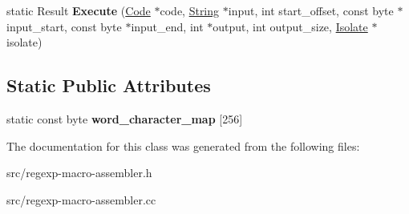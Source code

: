 \begin{DoxyCompactItemize}
\item 
\hypertarget{classv8_1_1internal_1_1_native_reg_exp_macro_assembler_acb1847e00b0dadbc2a75cba6baf1f192}{}static Result {\bfseries Execute} (\hyperlink{classv8_1_1internal_1_1_code}{Code} $\ast$code, \hyperlink{classv8_1_1internal_1_1_string}{String} $\ast$input, int start\+\_\+offset, const byte $\ast$input\+\_\+start, const byte $\ast$input\+\_\+end, int $\ast$output, int output\+\_\+size, \hyperlink{classv8_1_1internal_1_1_isolate}{Isolate} $\ast$isolate)\label{classv8_1_1internal_1_1_native_reg_exp_macro_assembler_acb1847e00b0dadbc2a75cba6baf1f192}

\end{DoxyCompactItemize}
\subsection*{Static Public Attributes}
\begin{DoxyCompactItemize}
\item 
\hypertarget{classv8_1_1internal_1_1_native_reg_exp_macro_assembler_ab96e1f9e3bc1f9938a06183c0ebf1fca}{}static const byte {\bfseries word\+\_\+character\+\_\+map} \mbox{[}256\mbox{]}\label{classv8_1_1internal_1_1_native_reg_exp_macro_assembler_ab96e1f9e3bc1f9938a06183c0ebf1fca}

\end{DoxyCompactItemize}


The documentation for this class was generated from the following files\+:\begin{DoxyCompactItemize}
\item 
src/regexp-\/macro-\/assembler.\+h\item 
src/regexp-\/macro-\/assembler.\+cc\end{DoxyCompactItemize}
